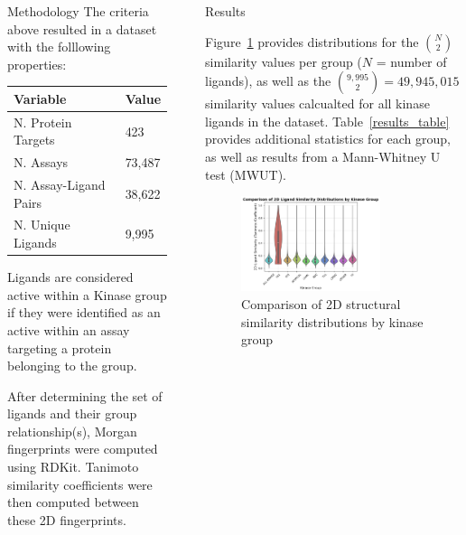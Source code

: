 \documentclass[final]{beamer}
\newlength{\sepwidth}
\newlength{\colwidth}
\newcommand{\separatorcolumn}{\begin{column}{\sepwidth}\end{column}}
\begin{document}
\begin{frame}[t]
\begin{columns}[t]
\begin{column}{\colwidth}
\begin{block}{Methodology}
    The criteria above resulted in a dataset with the folllowing properties:

    \begin{table}[!ht]
    \centering
    \begin{tabular}{l|l}
        \hline
        \textbf{Variable} & \textbf{Value} \\ \hline
        N. Protein Targets & 423 \\ \hline
        N. Assays & 73,487 \\ \hline
        N. Assay-Ligand Pairs & 38,622 \\ \hline
        N. Unique Ligands & 9,995 \\ \hline
    \end{tabular}
    \end{table}

    Ligands are considered active within a Kinase group if they were identified as an active within an assay targeting a protein belonging to the group. 

    After determining the set of ligands and their group relationship(s), Morgan fingerprints were computed using RDKit. Tanimoto similarity coefficients were then computed between these 2D fingerprints. 

  \end{block}
\end{column}

\separatorcolumn

\begin{column}{\colwidth}

  \begin{block}{Results}

    Figure~\ref{violin_plot} provides distributions for the ${N\choose 2}$ similarity values per group ($N$ = number of ligands), as well as the ${9,995 \choose 2} = 49,945,015$ similarity values calcualted for all kinase ligands in the dataset. Table~\ref{results_table} provides additional statistics for each group, as well as results from a Mann-Whitney U test (MWUT).
    \begin{figure}
        \centering
        \includegraphics[width=0.75\textwidth]{figures/violin_plot.png}
        \caption{Comparison of 2D structural similarity distributions by kinase group}
        \label{violin_plot}
    \end{figure}
    

\end{block}
\end{column}
\end{columns}
\end{frame}
\end{document}
